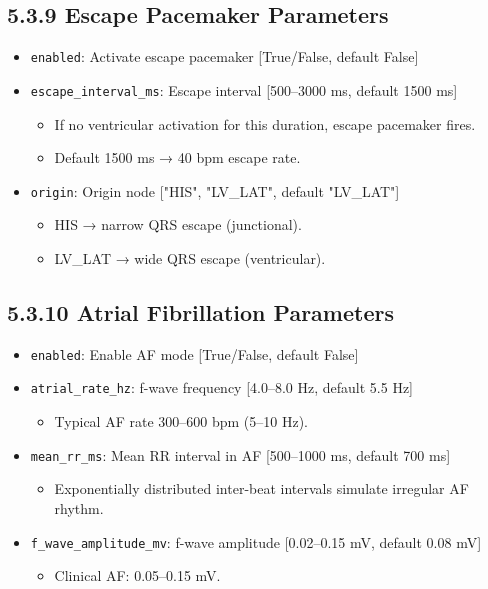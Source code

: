 \documentclass[12pt,oneside,a4paper]{book}
\newcommand{\code}[1]{\texttt{#1}}
\begin{document}
\subsection{5.3.9 Escape Pacemaker Parameters}

\begin{itemize}
  \item \code{enabled}: Activate escape pacemaker [True/False, default False]
  \item \code{escape\_interval\_ms}: Escape interval [500--3000 ms, default 1500 ms]
    \begin{itemize}
      \item If no ventricular activation for this duration, escape pacemaker fires.
      \item Default 1500 ms → 40 bpm escape rate.
    \end{itemize}
  \item \code{origin}: Origin node ["HIS", "LV\_LAT", default "LV\_LAT"]
    \begin{itemize}
      \item HIS → narrow QRS escape (junctional).
      \item LV\_LAT → wide QRS escape (ventricular).
    \end{itemize}
\end{itemize}

\subsection{5.3.10 Atrial Fibrillation Parameters}

\begin{itemize}
  \item \code{enabled}: Enable AF mode [True/False, default False]
  \item \code{atrial\_rate\_hz}: f-wave frequency [4.0--8.0 Hz, default 5.5 Hz]
    \begin{itemize}
      \item Typical AF rate 300--600 bpm (5--10 Hz).
    \end{itemize}
  \item \code{mean\_rr\_ms}: Mean RR interval in AF [500--1000 ms, default 700 ms]
    \begin{itemize}
      \item Exponentially distributed inter-beat intervals simulate irregular AF rhythm.
    \end{itemize}
  \item \code{f\_wave\_amplitude\_mv}: f-wave amplitude [0.02--0.15 mV, default 0.08 mV]
    \begin{itemize}
      \item Clinical AF: 0.05--0.15 mV.
    \end{itemize}
\end{itemize}
\end{document}
